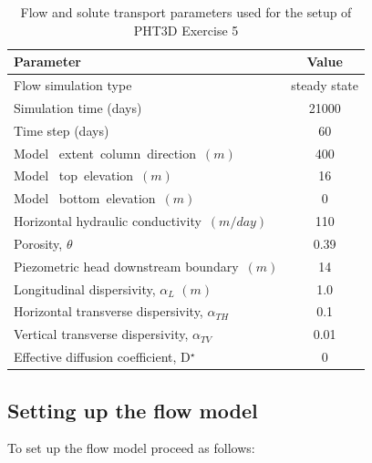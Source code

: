 \begin{table}[hb]
\caption{Flow and solute transport parameters used for the setup of PHT3D Exercise 5}
\begin{center}
\begin{tabular}{lc} 
\toprule
Parameter                                            &         Value \\
\midrule
Flow simulation type                                 &  steady state  \\
Simulation time (days)                               &  21000         \\
Time step (days)                                     &  60            \\
Model \  extent\ column\ direction\ $ (m)$           &  400           \\
Model \ top\ elevation\ $(m)$                        &   16           \\
Model \ bottom\ elevation\ $(m)$                     &   0            \\
Horizontal hydraulic conductivity\ $(m/day)$         &   110          \\ 
Porosity, $\theta$                                   &   0.39         \\
Piezometric head downstream boundary\ $(m) $         &  14            \\ 
Longitudinal dispersivity, $\alpha_L$   $(m)$        &   1.0          \\
Horizontal transverse dispersivity, $\alpha_{TH}$    &   0.1          \\
Vertical transverse dispersivity,   $\alpha_{TV}$    &   0.01         \\
Effective diffusion coefficient, D$^{\star}$         &   0            \\
\bottomrule

\end{tabular}
\label{cape_cod_table_1}
\end{center}
\end{table}

\subsection{Setting up the flow model}

To set up the flow model proceed as follows:

